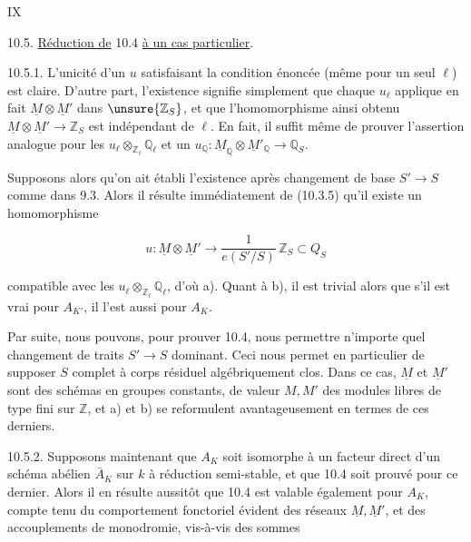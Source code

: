 \hfill IX

10.5. \uline{Réduction de} 10.4 \uline{à un cas particulier}.

10.5.1. L'unicité d'un $u$ satisfaisant la condition énoncée (même pour un seul $\ell$) est claire. D'autre part, l'existence signifie simplement que chaque $u_\ell$ applique en fait $\underline M\otimes\underline M'$ dans $\unsure{\mathbb Z_S}$, et que l'homomorphisme ainsi obtenu $\underline M\otimes\underline M'\longrightarrow\mathbb Z_S$ est indépendant de $\ell$. En fait, il suffit même de prouver l'assertion analogue pour les $u_\ell\otimes_{\mathbb Z_\ell}\mathbb Q_\ell$ et un $u_{\mathbb Q}:\underline M_{\mathbb Q}\otimes\underline M'_{\mathbb Q}\longrightarrow\mathbb Q_S$.

Supposons alors qu'on ait établi l'existence après changement de base $S'\longrightarrow S$ comme dans 9.3. Alors il résulte immédiatement de (10.3.5) qu'il existe un homomorphisme

\[
u:\underline M\otimes\underline M'\longrightarrow\frac{1}{e(S'/S)}\,\mathbb Z_S\subset Q_S
\]

compatible avec les $u_\ell\otimes_{\mathbb Z_\ell}\mathbb Q_\ell$, d'où a). Quant à b), il est trivial alors que s'il est vrai pour $A_{K'}$, il l'est aussi pour $A_K$.

Par suite, nous pouvons, pour prouver 10.4, nous permettre n'importe quel changement de traits $S'\longrightarrow S$ dominant. Ceci nous permet en particulier de supposer $S$ complet à corps résiduel algébriquement clos. Dans ce cas, $\underline M$ et $\underline M'$ sont des schémas en groupes constants, de valeur $M,M'$ des modules libres de type fini sur $\mathbb Z$, et a) et b) se reformulent avantageusement en termes de ces derniers.

10.5.2. Supposons maintenant que $A_K$ soit isomorphe à un facteur direct d'un schéma abélien $\bar A_K$ sur $k$ à réduction semi-stable, et que 10.4 soit prouvé pour ce dernier. Alors il en résulte aussitôt que 10.4 est valable également pour $A_K$, compte tenu du comportement fonctoriel évident des réseaux $\underline M,\underline M'$, et des accouplements de monodromie, vis-à-vis des sommes

